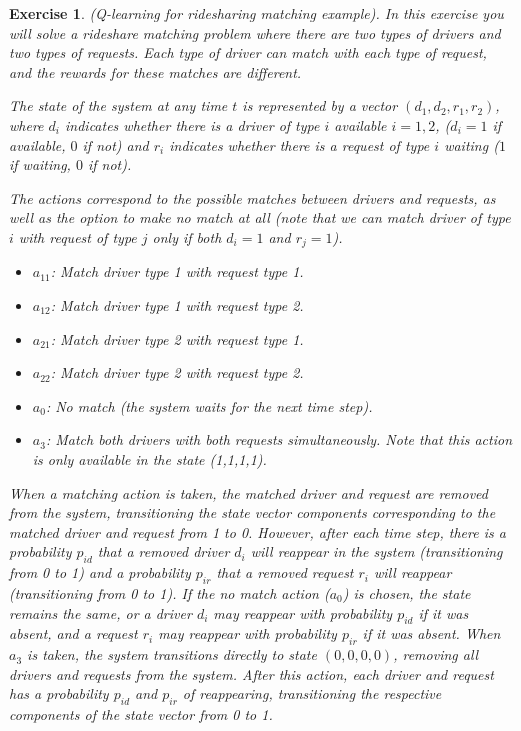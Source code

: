 \documentclass[letter,11pt]{article}
\newtheorem{exercise}{Exercise}[section]
\begin{document}
\begin{exercise} (Q-learning for ridesharing matching example). 
   In this exercise you will solve a rideshare matching problem where there are two types of drivers and two types of requests. Each type of driver can match with each type of request, and the rewards for these matches are different. 

   The state of the system at any time \( t \) is represented by a vector \( (d_1, d_2, r_1, r_2) \), where \( d_i \) indicates whether there is a driver of type $i$ available $i=1,2$, ($d_{i}=1$ if available, $0$ if not) and \( r_i \) indicates whether there is a request of type $i$ waiting ($1$ if waiting, $0$ if not).

   The actions correspond to the possible matches between drivers and requests, as well as the option to make no match at all (note that we can match driver of type $i$ with request of type $j$ only if both $d_{i}=1$ and $r_{j}=1$).
\begin{itemize}
    \item \( a_{11} \): Match driver type 1 with request type 1.
    \item \( a_{12} \): Match driver type 1 with request type 2.
    \item \( a_{21} \): Match driver type 2 with request type 1.
    \item \( a_{22} \): Match driver type 2 with request type 2.
    \item \( a_0 \): No match (the system waits for the next time step).
    \item \( a_3 \): Match both drivers with both requests simultaneously. Note that this action is only available in the state 
(1,1,1,1). 
\end{itemize}


When a matching action is taken, the matched driver and request are removed from the system, transitioning the state vector components corresponding to the matched driver and request from 1 to 0. However, after each time step, there is a probability \(p_{id}\) that a removed driver \(d_i\) will reappear in the system (transitioning from 0 to 1) and a probability \(p_{ir}\) that a removed request \(r_i\) will reappear (transitioning from 0 to 1). If the no match action (\(a_0\)) is chosen, the state remains the same, or a driver \(d_i\) may reappear with probability \(p_{id}\) if it was absent, and a request \(r_i\) may reappear with probability \(p_{ir}\) if it was absent.  When \(a_3\) is taken, the system transitions directly to state \((0,0,0,0)\), removing all drivers and requests from the system. After this action, each driver and request has a probability \(p_{id}\) and \(p_{ir}\) of reappearing, transitioning the respective components of the state vector from 0 to 1.


\end{exercise}
\end{document}
